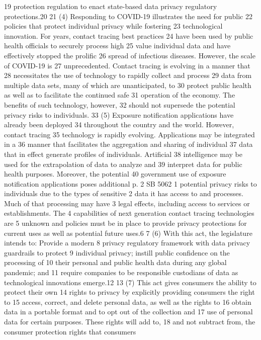 19 protection regulation to enact state-based data privacy regulatory
protections.20
21 (4) Responding to COVID-19 illustrates the need for public
22 policies that protect individual privacy while fostering
23 technological innovation. For years, contact tracing best practices
24 have been used by public health officials to securely process high
25 value individual data and have effectively stopped the prolific
26 spread of infectious diseases. However, the scale of COVID-19 is
27 unprecedented. Contact tracing is evolving in a manner that
28 necessitates the use of technology to rapidly collect and process
29 data from multiple data sets, many of which are unanticipated, to
30 protect public health as well as to facilitate the continued safe
31 operation of the economy. The benefits of such technology, however,
32 should not supersede the potential privacy risks to individuals.
33 (5) Exposure notification applications have already been deployed
34 throughout the country and the world. However, contact tracing
35 technology is rapidly evolving. Applications may be integrated in a
36 manner that facilitates the aggregation and sharing of individual
37 data that in effect generate profiles of individuals. Artificial
38 intelligence may be used for the extrapolation of data to analyze and
39 interpret data for public health purposes. Moreover, the potential
40 government use of exposure notification applications poses additional
p. 2 SB 5062
1 potential privacy risks to individuals due to the types of sensitive
2 data it has access to and processes. Much of that processing may have
3 legal effects, including access to services or establishments. The
4 capabilities of next generation contact tracing technologies are
5 unknown and policies must be in place to provide privacy protections
for current uses as well as potential future uses.6
7 (6) With this act, the legislature intends to: Provide a modern
8 privacy regulatory framework with data privacy guardrails to protect
9 individual privacy; instill public confidence on the processing of
10 their personal and public health data during any global pandemic; and
11 require companies to be responsible custodians of data as
technological innovations emerge.12
13 (7) This act gives consumers the ability to protect their own
14 rights to privacy by explicitly providing consumers the right to
15 access, correct, and delete personal data, as well as the rights to
16 obtain data in a portable format and to opt out of the collection and
17 use of personal data for certain purposes. These rights will add to,
18 and not subtract from, the consumer protection rights that consumers
